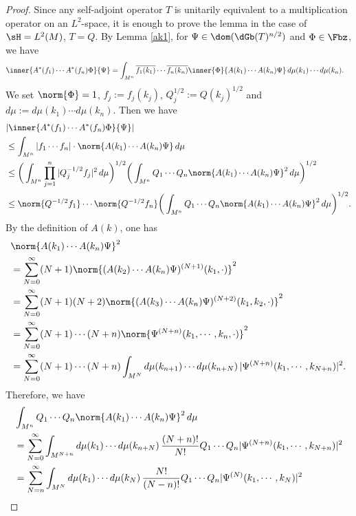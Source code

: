 \documentclass[12pt,draft]{article}
\theoremstyle{plain}
\numberwithin{equation}{section}
\theoremstyle{remark}
\begin{document}
\begin{proof}
Since any self-adjoint operator $T$ is unitarily equivalent to a multiplication operator on an $L^2$-space,
it is enough to prove the lemma in the case of $\sH=L^2(M)$, $T=Q$.
By Lemma \ref{ak1}, for $\Psi\in\dom(\dGb(T)^{n/2})$ and $\Phi\in\Fbz$, we have
\begin{align*}
 \inner{A^*(f_1)\cdots A^*(f_n)\Phi}{\Psi}
& =  \int_{M^n}  \overline{f_1(k_1)}\cdots \overline{f_n(k_n)} \inner{\Phi}{A(k_1)\cdots A(k_n)\Psi}\,d\mu(k_1)\cdots d\mu(k_n).
\end{align*}
We set $\norm{\Phi}=1$, $f_j:=f_j(k_j)$, $Q_j^{1/2}:=Q(k_j)^{1/2}$ and $d\mu:=d\mu(k_1)\cdots d\mu(k_n)$.  
Then we have
\begin{align*}
& |\inner{A^*(f_1)\cdots A^*(f_n)\Phi}{\Psi}| \\
& \leq  \int_{M^n}  |f_1 \cdots f_n|  \cdot \norm{A(k_1)\cdots A(k_n)\Psi}\,d\mu \\
& \leq  \bigg( \int_{M^n}  \prod_{j=1}^n |Q_j^{-1/2}f_j|^2\,d\mu \bigg)^{1/2}  
  \bigg( \int_{M^n} Q_1\cdots Q_n \norm{A(k_1)\cdots A(k_n)\Psi}^2\,d\mu \bigg)^{1/2} \\
& \leq  \norm{Q^{-1/2}f_1} \cdots \norm{Q^{-1/2}f_n}
  \bigg( \int_{M^n} Q_1\cdots Q_n \norm{A(k_1)\cdots A(k_n)\Psi}^2\,d\mu \bigg)^{1/2}.
\end{align*}
By the definition of $A(k)$, one has
\begin{align*}
&  \norm{A(k_1)\cdots A(k_n)\Psi}^2 \\
& = \sum_{N=0}^\infty (N+1)\norm{(A(k_2)\cdots A(k_n)\Psi)^{(N+1)}(k_1,\cdot)}^2 \\
& = \sum_{N=0}^\infty (N+1)(N+2)\norm{(A(k_3)\cdots A(k_n)\Psi)^{(N+2)}(k_1,k_2,\cdot)}^2 \\
& = \sum_{N=0}^\infty (N+1)\cdots (N+n) \norm{\Psi^{(N+n)}(k_1,\cdots,k_n,\cdot)}^2 \\
& = \sum_{N=0}^\infty (N+1)\cdots (N+n) \int_{M^N} d\mu(k_{n+1})\cdots d\mu(k_{n+N})\,|\Psi^{(N+n)}(k_1,\cdots,k_{N+n})|^2.
\end{align*}
Therefore, we have
\begin{align}
&\int_{M^n} Q_1\cdots Q_n \norm{A(k_1)\cdots A(k_n)\Psi}^2\,d\mu  \notag \\
&= \sum_{N=0}^\infty  \int_{M^{N+n}} d\mu(k_1)\cdots d\mu(k_{n+N})\,\frac{(N+n)!}{N!} Q_1\cdots Q_n| \Psi^{(N+n)}(k_1,\cdots,k_{N+n})|^2 \notag \\
&= \sum_{N=n}^\infty  \int_{M^N} d\mu(k_1)\cdots d\mu(k_N)\,\frac{N!}{(N-n)!} Q_1\cdots Q_n| \Psi^{(N)}(k_1,\cdots,k_N)|^2 \notag \\

\end{align}
\end{proof}
\end{document}
